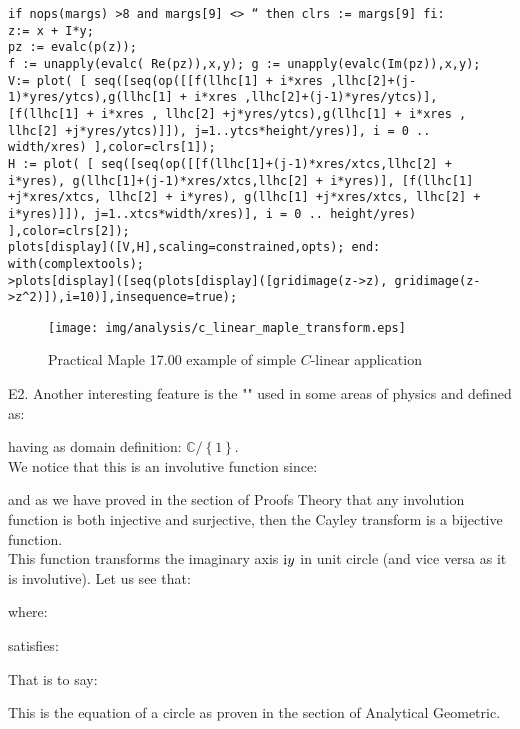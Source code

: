 	\begin{tcolorbox}[colframe=black,colback=white,sharp corners]
\texttt{if nops(margs) >8 and margs[9] <> `` then clrs := margs[9] fi:\\
z:= x + I*y;\\
pz := evalc(p(z));\\
f := unapply(evalc( Re(pz)),x,y); g := unapply(evalc(Im(pz)),x,y);\\
V:= plot( [
seq([seq(op([[f(llhc[1] + i*xres ,llhc[2]+(j-1)*yres/ytcs),g(llhc[1] + i*xres ,llhc[2]+(j-1)*yres/ytcs)], [f(llhc[1] + i*xres , llhc[2] +j*yres/ytcs),g(llhc[1] + i*xres , llhc[2] +j*yres/ytcs)]]),
j=1..ytcs*height/yres)], i = 0 .. width/xres)
],color=clrs[1]);\\
H := plot( [
seq([seq(op([[f(llhc[1]+(j-1)*xres/xtcs,llhc[2] + i*yres),
g(llhc[1]+(j-1)*xres/xtcs,llhc[2] + i*yres)], 
[f(llhc[1] +j*xres/xtcs, llhc[2] + i*yres),
g(llhc[1] +j*xres/xtcs, llhc[2] + i*yres)]]),
j=1..xtcs*width/xres)], i = 0 .. height/yres)
],color=clrs[2]);\\
plots[display]([V,H],scaling=constrained,opts);
end:\\
with(complextools);}\\

\texttt{>plots[display]([seq(plots[display]([gridimage(z->z), gridimage(z->z\string^2)]),i=10)],insequence=true);}
	\begin{figure}[H]
		\begin{center}
			\texttt{[image: img/analysis/c\_linear\_maple\_transform.eps]}
		\end{center}	
		\caption{Practical Maple 17.00 example of simple $C$-linear application}
	\end{figure}
	\end{tcolorbox}
	
	\begin{tcolorbox}[colframe=black,colback=white,sharp corners]
E2. Another interesting feature is the "" used in some areas of physics and defined as:
	
having as domain definition: $\mathbb{C}/\left\lbrace 1\right\rbrace$.\\

	We notice that this is an involutive function since:
	
	and as we have proved in the section of Proofs Theory that any involution function is both injective and surjective, then the Cayley transform is a bijective function.\\

This function transforms the imaginary axis $\mathrm{i} y$ in unit circle (and vice versa as it is involutive). Let us see that:
	
where:
	
satisfies:
	
That is to say:
	
This is the equation of a circle as proven in the section of Analytical Geometric.
	\end{tcolorbox}

